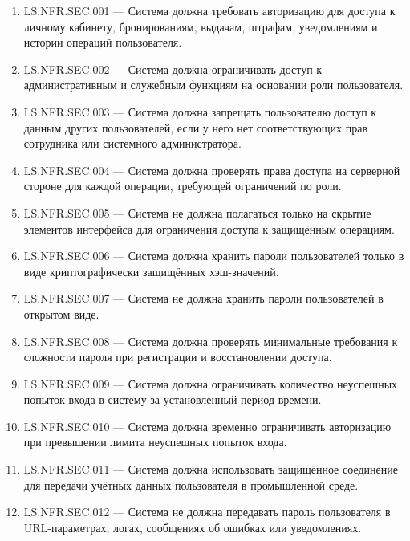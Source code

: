 \documentclass[12pt,a4paper]{article}
\begin{document}
	\begin{enumerate}
		\item LS.NFR.SEC.001 --- Система должна требовать авторизацию для доступа
		к личному кабинету, бронированиям, выдачам, штрафам, уведомлениям и истории
		операций пользователя.
		
		\item LS.NFR.SEC.002 --- Система должна ограничивать доступ к административным
		и служебным функциям на основании роли пользователя.
		
		\item LS.NFR.SEC.003 --- Система должна запрещать пользователю доступ к данным
		других пользователей, если у него нет соответствующих прав сотрудника
		или системного администратора.
		
		\item LS.NFR.SEC.004 --- Система должна проверять права доступа на серверной
		стороне для каждой операции, требующей ограничений по роли.
		
		\item LS.NFR.SEC.005 --- Система не должна полагаться только на скрытие элементов
		интерфейса для ограничения доступа к защищённым операциям.
		
		\item LS.NFR.SEC.006 --- Система должна хранить пароли пользователей только
		в виде криптографически защищённых хэш-значений.
		
		\item LS.NFR.SEC.007 --- Система не должна хранить пароли пользователей
		в открытом виде.
		
		\item LS.NFR.SEC.008 --- Система должна проверять минимальные требования
		к сложности пароля при регистрации и восстановлении доступа.
		
		\item LS.NFR.SEC.009 --- Система должна ограничивать количество неуспешных
		попыток входа в систему за установленный период времени.
		
		\item LS.NFR.SEC.010 --- Система должна временно ограничивать авторизацию
		при превышении лимита неуспешных попыток входа.
		
		\item LS.NFR.SEC.011 --- Система должна использовать защищённое соединение
		для передачи учётных данных пользователя в промышленной среде.
		
		\item LS.NFR.SEC.012 --- Система не должна передавать пароль пользователя
		в URL-параметрах, логах, сообщениях об ошибках или уведомлениях.
		

\end{enumerate}
\end{document}
